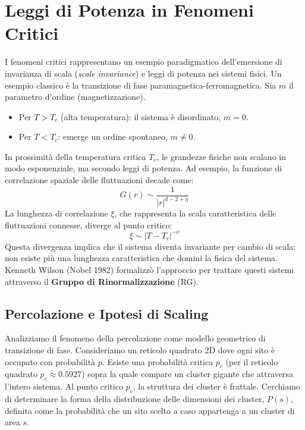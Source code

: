 \section{Leggi di Potenza in Fenomeni Critici}
I fenomeni critici rappresentano un esempio paradigmatico dell'emersione di invarianza di scala (\textit{scale invariance}) e leggi di potenza nei sistemi fisici. Un esempio classico è la transizione di fase paramagnetica-ferromagnetica.
Sia $m$ il parametro d'ordine (magnetizzazione).
\begin{itemize}
    \item Per $T > T_c$ (alta temperatura): il sistema è disordinato, $m=0$.
    \item Per $T < T_c$: emerge un ordine spontaneo, $m \neq 0$.
\end{itemize}
In prossimità della temperatura critica $T_c$, le grandezze fisiche non scalano in modo esponenziale, ma secondo leggi di potenza. Ad esempio, la funzione di correlazione spaziale delle fluttuazioni decade come:
\begin{equation}
    G(r) \sim \frac{1}{|r|^{d-2+\eta}}
\end{equation}
La lunghezza di correlazione $\xi$, che rappresenta la scala caratteristica delle fluttuazioni connesse, diverge al punto critico:
\begin{equation}
    \xi \sim |T - T_c|^{-\nu}
\end{equation}
Questa divergenza implica che il sistema diventa invariante per cambio di scala: non esiste più una lunghezza caratteristica che domini la fisica del sistema. Kenneth Wilson (Nobel 1982) formalizzò l'approccio per trattare questi sistemi attraverso il \textbf{Gruppo di Rinormalizzazione} (RG).

\subsection{Percolazione e Ipotesi di Scaling}

Analizziamo il fenomeno della percolazione come modello geometrico di transizione di fase. Consideriamo un reticolo quadrato 2D dove ogni sito è occupato con probabilità $p$. Esiste una probabilità critica $p_c$ (per il reticolo quadrato $p_c \approx 0.5927$) sopra la quale compare un cluster gigante che attraversa l'intero sistema.
Al punto critico $p_c$, la struttura dei cluster è frattale. Cerchiamo di determinare la forma della distribuzione delle dimensioni dei cluster, $P(s)$, definita come la probabilità che un sito scelto a caso appartenga a un cluster di area $s$.

